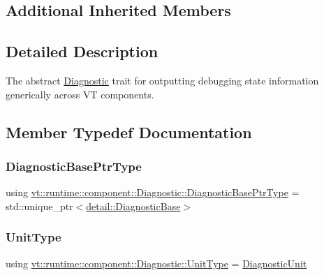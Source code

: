 \subsection*{Additional Inherited Members}


\subsection{Detailed Description}
The abstract {\ttfamily \hyperlink{structvt_1_1runtime_1_1component_1_1_diagnostic}{Diagnostic}} trait for outputting debugging state information generically across VT components. 

\subsection{Member Typedef Documentation}
\mbox{\label{structvt_1_1runtime_1_1component_1_1_diagnostic_ad95ea698535524d0f82c5da9beaaaf37}} 
\subsubsection{\texorpdfstring{Diagnostic\+Base\+Ptr\+Type}{DiagnosticBasePtrType}}
{\footnotesize\ttfamily using \hyperlink{structvt_1_1runtime_1_1component_1_1_diagnostic_ad95ea698535524d0f82c5da9beaaaf37}{vt\+::runtime\+::component\+::\+Diagnostic\+::\+Diagnostic\+Base\+Ptr\+Type} =  std\+::unique\+\_\+ptr$<$\hyperlink{structvt_1_1runtime_1_1component_1_1detail_1_1_diagnostic_base}{detail\+::\+Diagnostic\+Base}$>$}

\mbox{\label{structvt_1_1runtime_1_1component_1_1_diagnostic_a2bcd1016fcdb6395844d4fd15d84a570}} 
\subsubsection{\texorpdfstring{Unit\+Type}{UnitType}}
{\footnotesize\ttfamily using \hyperlink{namespacevt_1_1runtime_1_1component_a99ec18b08862c712176126bb7d0e307a}{vt\+::runtime\+::component\+::\+Diagnostic\+::\+Unit\+Type} =  \hyperlink{namespacevt_1_1runtime_1_1component_a99ec18b08862c712176126bb7d0e307a}{Diagnostic\+Unit}}

